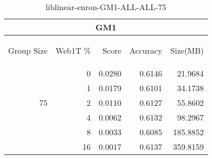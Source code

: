 \begin{center}
\begin{table}[htbp] 
 \begin{center}
\begin{tabular}{ | r | r | r | r | r |}
\hline
\multicolumn{5}{|c|}{GM1}\\
\hline
\begin{sideways}Group Size\end{sideways} & \begin{sideways}Web1T \%\end{sideways} & \begin{sideways}Score\end{sideways} & \begin{sideways}Accuracy\end{sideways} & \begin{sideways}Size(MB)\end{sideways}\\
\hline
\multirow{5}{*}{75}
 & 0 & 0.0280 & 0.6146 & 21.9684\\ \cline{2-5}
 & 1 & 0.0179 & 0.6101 & 34.1738\\ \cline{2-5}
 & 2 & 0.0110 & 0.6127 & 55.8602\\ \cline{2-5}
 & 4 & 0.0062 & 0.6132 & 98.2967\\ \cline{2-5}
 & 8 & 0.0033 & 0.6085 & 185.8852\\ \cline{2-5}
 & 16 & 0.0017 & 0.6137 & 359.8159\\ \cline{2-5}
\hline
\end{tabular}
\caption{liblinear-enron-GM1-ALL-ALL-75}
\label{table:liblinear-enron-GM1-ALL-ALL-75}
\end{center}
 \end{table}
\end{center}

